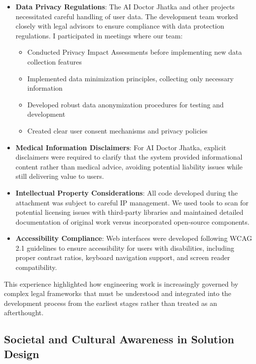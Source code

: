 \documentclass[12pt,a4paper]{article}
\begin{document}
\begin{itemize}
    \item \textbf{Data Privacy Regulations}: The AI Doctor Jhatka and other projects necessitated careful handling of user data. The development team worked closely with legal advisors to ensure compliance with data protection regulations. I participated in meetings where our team:
    \begin{itemize}
        \item Conducted Privacy Impact Assessments before implementing new data collection features
        \item Implemented data minimization principles, collecting only necessary information
        \item Developed robust data anonymization procedures for testing and development
        \item Created clear user consent mechanisms and privacy policies
    \end{itemize}
    
    \item \textbf{Medical Information Disclaimers}: For AI Doctor Jhatka, explicit disclaimers were required to clarify that the system provided informational content rather than medical advice, avoiding potential liability issues while still delivering value to users.
    
    \item \textbf{Intellectual Property Considerations}: All code developed during the attachment was subject to careful IP management. We used tools to scan for potential licensing issues with third-party libraries and maintained detailed documentation of original work versus incorporated open-source components.
    
    \item \textbf{Accessibility Compliance}: Web interfaces were developed following WCAG 2.1 guidelines to ensure accessibility for users with disabilities, including proper contrast ratios, keyboard navigation support, and screen reader compatibility.
\end{itemize}

This experience highlighted how engineering work is increasingly governed by complex legal frameworks that must be understood and integrated into the development process from the earliest stages rather than treated as an afterthought.

\subsection{Societal and Cultural Awareness in Solution Design}
\end{document}
